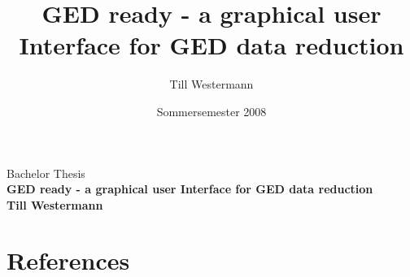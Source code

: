 \documentclass[german,a4paper,12pt,oneside]{paper}
\begin{document}



\title{\Huge GED ready - a graphical user Interface for GED data reduction }
\author{Till Westermann}
\date{Sommersemester 2008}
\thispagestyle{empty}
\begin{center}
\Large Bachelor Thesis \\  \vspace{3.0cm}
\Huge\sffamily\bfseries GED ready - a graphical user Interface for GED data reduction  \normalsize  \\ 
\vspace{10.0cm}
Till Westermann 
\end{center}

\newpage\thispagestyle{empty}



\tableofcontents
 \newpage\thispagestyle{plain}

\pagestyle{plain}
%
\clearpage\newpage
\setcounter{section}{0}

   
   
      

\section{References} 

\end{document}
